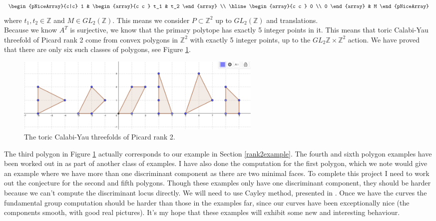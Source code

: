 \documentclass[oneside,reqno]{amsart}
\theoremstyle{definition}
\theoremstyle{definition}
\theoremstyle{definition}
\theoremstyle{definition}
\newcommand{\Z}{\mathbb{Z}}
\begin{document}
\[
\begin{pNiceArray}{c|c}
  1 & \begin{array}{c c } 
    t_1 & t_2
 \end{array} \\
  \hline
  \begin{array}{c c } 
    0 \\
    0
 \end{array} & M
\end{pNiceArray}
\]
where $t_1,t_2 \in \Z$ and $M \in GL_{2} (\Z)$. This means we consider $P\subset \Z^2$ up to $GL_{2} (\Z)$ and translations. \\
\newline
Because we know $A^T$ is surjective, we know that the primary polytope has exactly 5 integer points in it. This means that toric Calabi-Yau threefold of Picard rank 2 come from convex polygons in $\Z^2$ with exactly 5 integer points, up to the $GL_{2} \Z \times \Z^2$ action. We have proved that there are only six such classes of  polygons, see Figure \ref{CY3rank2}.
\begin{figure}[!h]
    \centering
    \includegraphics[width=12cm]{3foldsofpicardrank2.png}
    \caption{The toric Calabi-Yau threefolds of Picard rank 2.}
    \label{CY3rank2}
\end{figure}
The third polygon in Figure \ref{CY3rank2} actually corresponds to our example in Section \ref{rank2example}. The fourth and sixth polygon examples have been worked out in \cite{edwill} as part of another class of examples. I have also done the computation for the first polygon, which we note would give an example where we have more than one discriminant component as there are two minimal faces. To complete this project I need to work out the conjecture for the second and fifth polygons. Though these examples only have one discriminant component, they should be harder because we can't compute the discriminant locus directly. We will need to use Cayley method, presented in \cite[Chapter 2]{gelfand1994discriminants}. Once we have the curves the fundamental group computation should be harder than those in the examples far, since our curves have been exceptionally nice (the components smooth, with good real pictures). It's my hope that these examples will exhibit some new and interesting behaviour. \\
\end{document}
